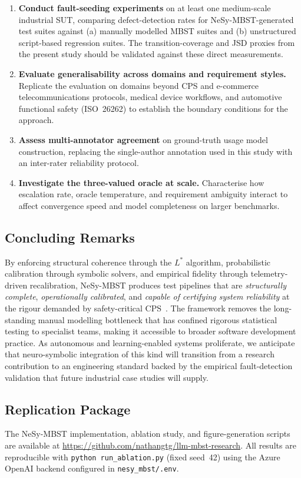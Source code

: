 \begin{enumerate}
    \item \textbf{Conduct fault-seeding experiments} on at least one
    medium-scale industrial SUT, comparing defect-detection rates for
    NeSy-MBST-generated test suites against (a) manually modelled MBST
    suites and (b) unstructured script-based regression suites.  The
    transition-coverage and JSD proxies from the present study should
    be validated against these direct measurements.

    \item \textbf{Evaluate generalisability across domains and
    requirement styles.}  Replicate the evaluation on domains beyond
    CPS and e-commerce telecommunications protocols, medical device
    workflows, and automotive functional safety (ISO~26262) to
    establish the boundary conditions for the approach.

    \item \textbf{Assess multi-annotator agreement} on ground-truth
    usage model construction, replacing the single-author annotation
    used in this study with an inter-rater reliability protocol.

    \item \textbf{Investigate the three-valued oracle at scale.}
    Characterise how escalation rate, oracle temperature, and
    requirement ambiguity interact to affect convergence speed and
    model completeness on larger benchmarks.
\end{enumerate}

\subsection{Concluding Remarks}

By enforcing structural coherence through the $L^{*}$ algorithm,
probabilistic calibration through symbolic solvers, and empirical
fidelity through telemetry-driven recalibration, NeSy-MBST produces
test pipelines that are \emph{structurally complete},
\emph{operationally calibrated}, and \emph{capable of certifying
system reliability} at the rigour demanded by safety-critical
CPS~\cite{neurostrata, taxonomy_mbt}.  The framework removes the
long-standing manual modelling bottleneck that has confined rigorous
statistical testing to specialist teams, making it accessible to
broader software development practice.  As autonomous and
learning-enabled systems proliferate, we anticipate that
neuro-symbolic integration of this kind will transition from a
research contribution to an engineering standard backed by the
empirical fault-detection validation that future industrial case
studies will supply.

\subsection*{Replication Package}

The NeSy-MBST implementation, ablation study, and figure-generation
scripts are available at
\url{https://github.com/nathangtg/llm-mbst-research}.
All results are reproducible with \texttt{python run\_ablation.py}
(fixed seed~42) using the Azure OpenAI backend configured in
\texttt{nesy\_mbst/.env}.
